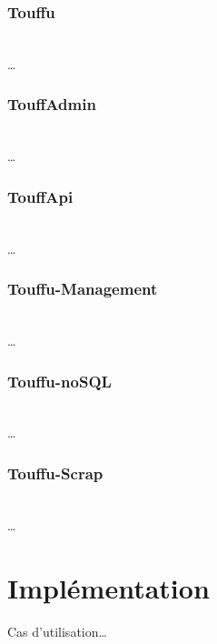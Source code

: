 \documentclass[conference]{IEEEtran}
\begin{document}
\subsubsection*{Touffu}
\hfil\\
…\\

\subsubsection*{TouffAdmin}
\hfil\\
…\\

\subsubsection*{TouffApi}
\hfil\\
…\\

\subsubsection*{Touffu-Management}
\hfil\\
…\\

\subsubsection*{Touffu-noSQL}
\hfil\\
…\\

\subsubsection*{Touffu-Scrap}
\hfil\\
…\\

\section{Implémentation}

{Cas d'utilisation…}
\end{document}
